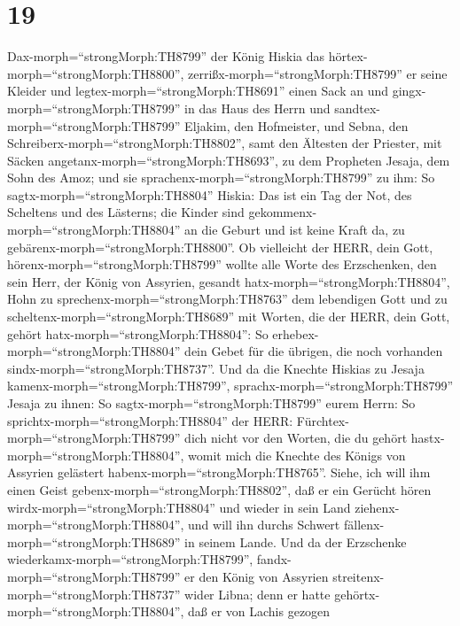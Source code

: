 \hypertarget{section-18}{%
\section{19}\label{section-18}}

 Dax-morph=``strongMorph:TH8799'' der König Hiskia das
hörtex-morph=``strongMorph:TH8800'',
zerrißx-morph=``strongMorph:TH8799'' er seine Kleider und
legtex-morph=``strongMorph:TH8691'' einen Sack an und
gingx-morph=``strongMorph:TH8799'' in das Haus des Herrn 
und sandtex-morph=``strongMorph:TH8799'' Eljakim, den Hofmeister, und
Sebna, den Schreiberx-morph=``strongMorph:TH8802'', samt den Ältesten
der Priester, mit Säcken angetanx-morph=``strongMorph:TH8693'', zu dem
Propheten Jesaja, dem Sohn des Amoz;  und sie
sprachenx-morph=``strongMorph:TH8799'' zu ihm: So
sagtx-morph=``strongMorph:TH8804'' Hiskia: Das ist ein Tag der Not, des
Scheltens und des Lästerns; die Kinder sind
gekommenx-morph=``strongMorph:TH8804'' an die Geburt und ist keine Kraft
da, zu gebärenx-morph=``strongMorph:TH8800''.  Ob vielleicht
der HERR, dein Gott, hörenx-morph=``strongMorph:TH8799'' wollte alle
Worte des Erzschenken, den sein Herr, der König von Assyrien, gesandt
hatx-morph=``strongMorph:TH8804'', Hohn zu
sprechenx-morph=``strongMorph:TH8763'' dem lebendigen Gott und zu
scheltenx-morph=``strongMorph:TH8689'' mit Worten, die der HERR, dein
Gott, gehört hatx-morph=``strongMorph:TH8804'': So
erhebex-morph=``strongMorph:TH8804'' dein Gebet für die übrigen, die
noch vorhanden sindx-morph=``strongMorph:TH8737''.  Und da
die Knechte Hiskias zu Jesaja kamenx-morph=``strongMorph:TH8799'',
 sprachx-morph=``strongMorph:TH8799'' Jesaja zu ihnen: So
sagtx-morph=``strongMorph:TH8799'' eurem Herrn: So
sprichtx-morph=``strongMorph:TH8804'' der HERR:
Fürchtex-morph=``strongMorph:TH8799'' dich nicht vor den Worten, die du
gehört hastx-morph=``strongMorph:TH8804'', womit mich die Knechte des
Königs von Assyrien gelästert habenx-morph=``strongMorph:TH8765''.
 Siehe, ich will ihm einen Geist
gebenx-morph=``strongMorph:TH8802'', daß er ein Gerücht hören
wirdx-morph=``strongMorph:TH8804'' und wieder in sein Land
ziehenx-morph=``strongMorph:TH8804'', und will ihn durchs Schwert
fällenx-morph=``strongMorph:TH8689'' in seinem Lande.  Und
da der Erzschenke wiederkamx-morph=``strongMorph:TH8799'',
fandx-morph=``strongMorph:TH8799'' er den König von Assyrien
streitenx-morph=``strongMorph:TH8737'' wider Libna; denn er hatte
gehörtx-morph=``strongMorph:TH8804'', daß er von Lachis gezogen
